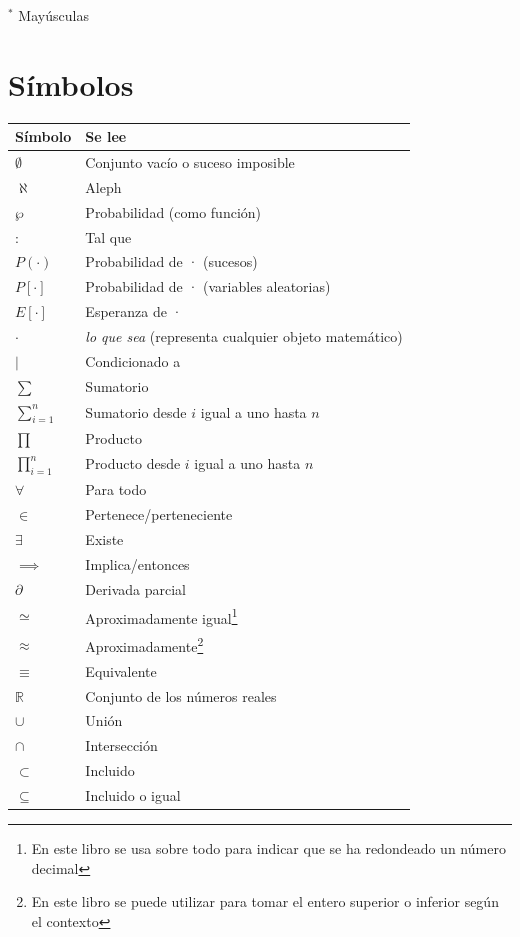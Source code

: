 \documentclass[
]{book}
\begin{document}
\(^*\) Mayúsculas

\hypertarget{suxedmbolos}{%
\section{Símbolos}\label{suxedmbolos}}

\begin{longtable}[]{@{}ll@{}}
\toprule
Símbolo & Se lee \\
\midrule
\endhead
\(\emptyset\) & Conjunto vacío o suceso imposible \\
\(\aleph\) & Aleph \\
\(\wp\) & Probabilidad (como función) \\
\(:\) & Tal que \\
\(P(\cdot)\) & Probabilidad de · (sucesos) \\
\(P[\cdot]\) & Probabilidad de · (variables aleatorias) \\
\(E[\cdot]\) & Esperanza de · \\
\(\cdot\) & \emph{lo que sea} (representa cualquier objeto matemático) \\
\(|\) & Condicionado a \\
\(\sum\) & Sumatorio \\
\(\sum\limits_{i=1}^n\) & Sumatorio desde \(i\) igual a uno hasta \(n\) \\
\(\prod\) & Producto \\
\(\prod\limits_{i=1}^n\) & Producto desde \(i\) igual a uno hasta \(n\) \\
\(\forall\) & Para todo \\
\(\in\) & Pertenece/perteneciente \\
\(\exists\) & Existe \\
\(\implies\) & Implica/entonces \\
\(\partial\) & Derivada parcial \\
\(\simeq\) & Aproximadamente igual\footnote{En este libro se usa sobre todo para indicar que se ha redondeado un número decimal} \\
\(\approx\) & Aproximadamente\footnote{En este libro se puede utilizar para tomar el entero superior o inferior según el contexto} \\
\(\equiv\) & Equivalente \\
\(\mathbb{R}\) & Conjunto de los números reales \\
\(\cup\) & Unión \\
\(\cap\) & Intersección \\
\(\subset\) & Incluido \\
\(\subseteq\) & Incluido o igual \\
\bottomrule
\end{longtable}
\end{document}
